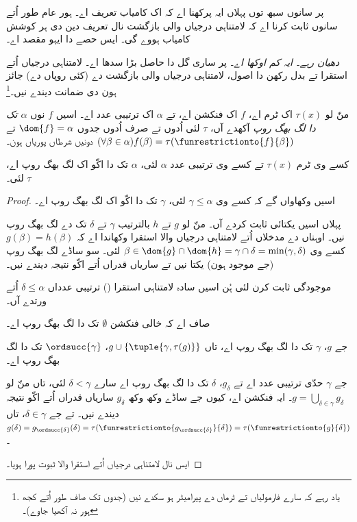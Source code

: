 \documentclass[../../../include/open-logic-section]{subfiles}
\begin{document}

پر سانوں سبھ توں پہلاں ایہ پرکھنا اے کہ 
اک کامیاب تعریف اے۔ ہور عام طور اُتے سانوں ثابت کرنا اے کہ لامتناہی
درجیاں والی بازگشت نال تعریف دین دی ہر کوشش کامیاب ہووے گی۔ ایس حصے دا ایہو مقصد اے۔

\emph{دھیان رہے۔ ایہ کم اوکھا اے}۔ پر ساری گل دا حاصل بڑا سدھا اے۔
لامتناہی درجیاں اُتے استقرا تے بدل رکھن دا اصول، لامتناہی درجیاں والی
بازگشت دے (کئی روپاں دے) جائز ہون دی ضمانت دیندے نیں۔\footnote{یاد رہے
کہ سارے فارمولیاں تے ٹرماں دے پیرامیٹر ہو سکدے نیں (جدوں تک صاف طور اُتے
کجھ ہور نہ آکھیا جاوے)۔}

\begin{defn}
منّ لو $\tau(x)$ اک ٹرم اے، $f$ اک فنکشن اے، تے $\alpha$ اک ترتیبی عدد اے۔
اسیں $f$ نوں \emph{$\alpha$ تک دا لگ بھگ روپ} آکھدے آں، $\tau$ لئی
اُدوں تے صرف اُدوں جدوں $\dom{f} = \alpha$ تے
$(\forall \beta \in \alpha)f(\beta) = \tau(\funrestrictionto{f}{\beta})$
دونیں شرطاں پوریاں ہون۔
\end{defn}

\begin{lem}
کسے وی ٹرم $\tau(x)$ تے کسے وی ترتیبی عدد $\alpha$ لئی، $\alpha$ تک دا
اکّو اک لگ بھگ روپ اے، $\tau$ لئی۔
\end{lem}
\begin{proof}
اسیں وکھاواں گے کہ کسے وی $\gamma \leq \alpha$ لئی، $\gamma$ تک دا
اکّو اک لگ بھگ روپ اے۔

پہلاں اسیں یکتائی ثابت کردے آں۔ منّ لو $g$ تے $h$ بالترتیب $\gamma$ تے
$\delta$ تک دے لگ بھگ روپ نیں۔ اوہناں دے مدخلاں اُتے لامتناہی درجیاں
والا استقرا وکھاندا اے کہ $g(\beta) = h(\beta)$ کسے وی
$\beta \in \dom{g} \cap \dom{h} = \gamma \cap \delta = \min(\gamma, \delta)$
لئی۔ سو ساڈے لگ بھگ روپ (جے موجود ہون) یکتا نیں تے ساریاں قدراں اُتے
اکّو نتیجہ دیندے نیں۔

موجودگی ثابت کرن لئی ہُن اسیں سادہ لامتناہی استقرا
() ترتیبی عدداں
$\delta \leq \alpha$ اُتے ورتدے آں۔

صاف اے کہ خالی فنکشن $\emptyset$ تک دا لگ بھگ روپ اے۔

جے $g$، $\gamma$ تک دا لگ بھگ روپ اے، تاں $g \cup
\{\tuple{\gamma, \tau(g)}\}$، $\ordsucc{\gamma}$ تک دا لگ بھگ روپ اے۔

جے $\gamma$ حدّی ترتیبی عدد اے تے $g_\delta$، $\delta$ تک دا لگ بھگ
روپ اے سارے $\delta < \gamma$ لئی، تاں منّ لو
$g = \bigcup_{\delta \in \gamma} g_\delta$۔ ایہ فنکشن اے، کیوں جے ساڈے
وکھ وکھ $g_\delta$ ساریاں قدراں اُتے اکّو نتیجہ دیندے نیں۔ تے جے
$\delta \in \gamma$، تاں $g(\delta) = g_{\ordsucc{\delta}}(\delta) =
\tau(\funrestrictionto{g_{\ordsucc{\delta}}}{\delta}) =
\tau(\funrestrictionto{g}{\delta})$۔

ایس نال لامتناہی درجیاں اُتے استقرا والا ثبوت پورا ہویا۔
\end{proof}
\end{document}
